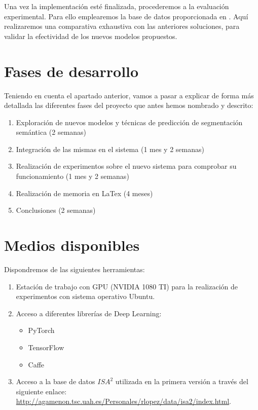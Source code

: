 \documentclass[12pt,oneside,a4paper]{article}
\begin{document}
Una vez la implementación esté finalizada, procederemos a la evaluación experimental. Para ello emplearemos la base de datos proporcionada en \cite{isa2}. Aquí realizaremos una comparativa exhaustiva con las anteriores soluciones, para validar la efectividad de los nuevos modelos propuestos.


\section{Fases de desarrollo}

Teniendo en cuenta el apartado anterior, vamos a pasar a explicar de forma más detallada las diferentes fases del proyecto que antes hemos nombrado y descrito:

\begin{enumerate}
 \item Exploración de nuevos modelos y técnicas de predicción de segmentación semántica (2 semanas)
 \item Integración de las mismas en el sistema (1 mes y 2 semanas)
 \item Realización de experimentos sobre el nuevo sistema para comprobar su funcionamiento (1 mes y 2 semanas)
 \item Realización de memoria en LaTex (4 meses)
 \item Conclusiones (2 semanas)
\end{enumerate}

\section{Medios disponibles}

Dispondremos de las siguientes herramientas:

\begin{enumerate}
	\item Estación de trabajo con GPU (NVIDIA 1080 TI) para la realización de experimentos con sistema operativo Ubuntu.
	\item Acceso a diferentes librerías de Deep Learning:
	\begin{itemize}
	\item PyTorch
	\item TensorFlow 
	\item Caffe
	\end{itemize}
	\item Acceso a la base de datos $ISA^2$ utilizada en la primera versión \cite{isa2} a través del siguiente enlace: \url{http://agamenon.tsc.uah.es/Personales/rlopez/data/isa2/index.html}.
\end{enumerate}

 








\end{document}
